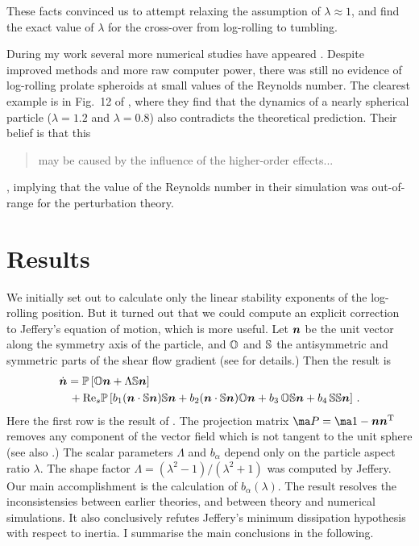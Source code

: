 \documentclass[thesis.tex]{subfiles}
\begin{document}
These facts convinced us to attempt relaxing the assumption of $\lambda\approx1$, and find the exact value of $\lambda$ for the cross-over from log-rolling to tumbling.

During my work several more numerical studies have appeared \cite{rosen2014,mao2014,rosen2015a,rosen2015b}. Despite improved methods and more raw computer power, there was still no evidence of log-rolling prolate spheroids at small values of the Reynolds number. The clearest example is in Fig.~12 of \citet{mao2014}, where they find that the dynamics of a nearly spherical particle ($\lambda=1.2$ and $\lambda=0.8$) also contradicts the theoretical prediction. Their belief is that this \blockquote{may be caused by the influence
of the higher-order effects...}, implying that the value of the Reynolds number in their simulation was out-of-range for the perturbation theory.

\section{Results}

We initially set out to calculate only the linear stability exponents of the log-rolling position. But it turned out that we could compute an explicit correction to Jeffery's equation of motion, which is more useful. Let $\mbox{\boldmath$n$}$ be the unit vector along the symmetry axis of the particle, and $\mathbb{O}$ and $\mathbb{S}$ the antisymmetric and symmetric parts of the shear flow gradient (see  for details.) Then the result is
\begin{align}
\eqnlab{ndoteffective}
  \dot {\ve n} &=  
\ma P\left[\ma O \ve n + \Lambda\ma S\ve n\right]\\
&\,+\Reys\ma P\left[b_1 (\ve n \cdot \ma S \ve n)\ma S \ve n
+ b_2 (\ve n \cdot \ma S \ve n)\ma O \ve n 
+b_3\,  \ma O \ma S \ve n 
+ b_4\,  \ma S \ma S \ve n\right]\,. \nn
\end{align}
Here the first row is the result of \citet{jeffery1922}. The projection matrix $\ma P=\ma 1 - \ve n \ve n\transpose$ removes any component of the vector field which is not tangent to the unit sphere (see also .) The scalar parameters $\Lambda$ and $b_\alpha$ depend only on the particle aspect ratio $\lambda$. The shape factor $\Lambda=(\lambda^2-1)/(\lambda^2+1)$ was computed by Jeffery. Our main accomplishment is the calculation of $b_\alpha(\lambda)$.
The result  resolves the inconsistensies between earlier theories, and between theory and numerical simulations. It also conclusively refutes Jeffery's minimum dissipation hypothesis with respect to inertia. I summarise the main conclusions in the following.
\end{document}
